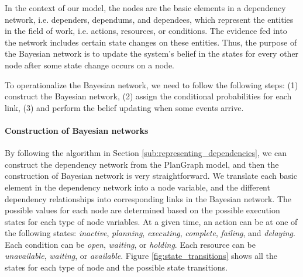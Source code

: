 In the context of our model, the nodes are the basic elements in a dependency network, i.e. dependers, dependums, and dependees, which represent the entities in the field of work, i.e.  actions, resources, or conditions. The evidence fed into the network includes certain state changes on these entities. Thus, the purpose of the Bayesian network is to update the system’s belief in the states for every other node after some state change occurs on a node.

To operationalize the Bayesian network, we need to follow the following steps: (1) construct the Bayesian network, (2) assign the conditional probabilities for each link, (3) and perform the belief updating when some events arrive.

\paragraph*{Construction of Bayesian networks} %
\label{par:construction_of_bayesian_networks}
By following the algorithm in Section \ref{sub:representing_dependencies}, we can construct the dependency network from the PlanGraph model, and then the construction of Bayesian network is very straightforward. We translate each basic element in the dependency network into a node variable, and the different dependency relationships into corresponding links in the Bayesian network. The possible values for each node are determined based on the possible execution states for each type of node variables. At a given time, an action can be at one of the following states: \emph{inactive}, \emph{planning}, \emph{executing}, \emph{complete}, \emph{failing}, and \emph{delaying}. Each condition can be \emph{open}, \emph{waiting}, or \emph{holding}. Each resource can be \emph{unavailable}, \emph{waiting}, or \emph{available}. Figure \ref{fig:state_transitions} shows all the states for each type of node and the possible state transitions.
